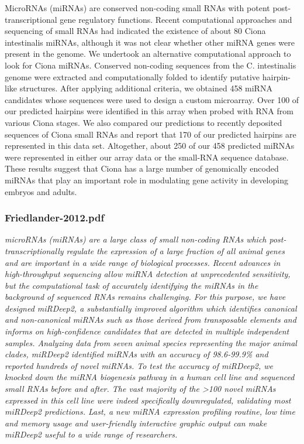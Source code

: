 \documentclass[graybox]{svmult}
\begin{document}
\cite{Keshavan2010}
MicroRNAs (miRNAs) are conserved non-coding small RNAs with potent post-transcriptional gene
regulatory functions. Recent computational approaches and sequencing of small RNAs had indicated
the existence of about 80 Ciona intestinalis miRNAs, although it was not clear whether other
miRNA genes were present in the genome. We undertook an alternative computational approach
to look for Ciona miRNAs. Conserved non-coding sequences from the C. intestinalis genome were
extracted and computationally folded to identify putative hairpin-like structures. After applying additional
criteria, we obtained 458 miRNA candidates whose sequences were used to design a custom
microarray. Over 100 of our predicted hairpins were identified in this array when probed with RNA
from various Ciona stages. We also compared our predictions to recently deposited sequences of
Ciona small RNAs and report that 170 of our predicted hairpins are represented in this data set.
Altogether, about 250 of our 458 predicted miRNAs were represented in either our array data or the
small-RNA sequence database. These results suggest that Ciona has a large number of genomically
encoded miRNAs that play an important role in modulating gene activity in developing
embryos and adults.


\subsubsection{Friedlander-2012.pdf}
\cite{Friedlander2012}
\textit{microRNAs (miRNAs) are a large class of small non-coding RNAs which post-transcriptionally regulate the expression of a large fraction of all animal genes and are important in a wide range of biological processes. Recent advances in high-throughput sequencing allow miRNA detection at unprecedented sensitivity, but the computational task of accurately identifying the miRNAs in the background of sequenced RNAs remains challenging. For this purpose, we have designed miRDeep2, a substantially improved algorithm which identifies canonical and non-canonical miRNAs such as those derived from transposable elements and informs on high-confidence candidates that are detected in multiple independent samples. Analyzing data from seven animal species representing the major animal clades, miRDeep2 identified miRNAs with an accuracy of 98.6-99.9{\%} and reported hundreds of novel miRNAs. To test the accuracy of miRDeep2, we knocked down the miRNA biogenesis pathway in a human cell line and sequenced small RNAs before and after. The vast majority of the {\textgreater}100 novel miRNAs expressed in this cell line were indeed specifically downregulated, validating most miRDeep2 predictions. Last, a new miRNA expression profiling routine, low time and memory usage and user-friendly interactive graphic output can make miRDeep2 useful to a wide range of researchers.}
\end{document}
